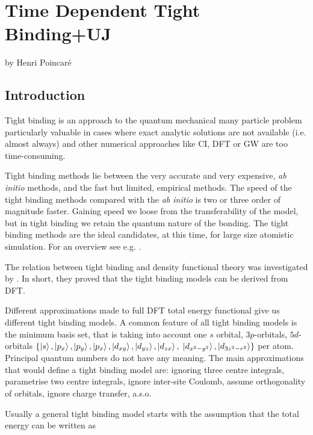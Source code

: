 \chapter[TDTB+UJ]%
{Time Dependent Tight Binding+UJ}
\label{ch:one}
%
{by Henri Poincar\'e}
%
\section{Introduction}
\par{Tight binding is an approach to the quantum mechanical many particle problem particularly valuable in cases
where exact analytic solutions are not available (i.e. almost always) and other numerical approaches
like CI, DFT or GW are too time-consuming.}
\par{Tight binding methods lie between the very accurate and very expensive,
\emph{ab initio} methods, and the fast but limited, empirical methods. The
speed of the tight binding methods compared with the \emph{ab initio} is two
or three order of magnitude faster. Gaining speed we loose from the
transferability of the model, but in tight binding we retain the quantum
nature of the bonding. The tight binding methods are the ideal candidates, at
this time, for large size atomistic simulation. For an overview see e.g. \citep{Finnis03,Goringe97b}.}
\par{The relation between tight binding and density functional theory was
  investigated by \citep{Sutton88,Foulkes89,Frauenheim00}. In short, they
  proved that the tight binding models can be derived from DFT.}
\par{Different approximations made to full DFT total energy functional give us
different tight binding models. A common feature of all tight binding models
is the minimum basis set, that is taking into account  one $s$ orbital,
$3p$-orbitals, $5d$-orbitals
$\{\mathinner{|{s}\rangle},\mathinner{|{p_x}\rangle},\mathinner{|{p_y}\rangle},\mathinner{|{p_x}\rangle},\mathinner{|{d_{xy}}\rangle},\mathinner{|{d_{yz}}\rangle},\mathinner{|{d_{zx}}\rangle},$
$\mathinner{|{d_{x^2-y^2}}\rangle},\mathinner{|{d_{3z^2-r^2}}\rangle}\}$
per atom. Principal quantum numbers do not have any meaning. The main
approximations that would define a tight binding model are: ignoring three
centre integrals, parametrise two centre integrals, ignore inter-site Coulomb,
assume orthogonality of orbitals, ignore charge transfer, a.s.o.}
\par{Usually a general tight binding model starts with the assumption that the
total energy can be written as}

